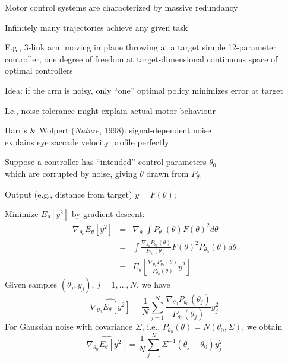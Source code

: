 \documentclass{article}
\begin{document}
\begin{huge}

Motor control systems are characterized by massive redundancy

Infinitely many trajectories achieve any given task

E.g., 3-link arm moving in plane throwing at a target\nl
  simple 12-parameter controller, one degree of freedom at target-dimensional continuous space of optimal controllers

Idea: if the arm is noisy, only ``one'' optimal policy
minimizes error at target

I.e., noise-tolerance might explain actual motor behaviour

Harris \& Wolpert ({\em Nature}, 1998):  signal-dependent noise\\
explains eye saccade velocity profile perfectly


Suppose a controller has ``intended'' control parameters $\theta_0$\\
which are corrupted by noise, giving $\theta$ drawn from $P_{\theta_0}$

Output (e.g., distance from target) $y = F(\theta)$; 


\maxfigwidth
{}



Minimize $E_{\theta}[y^2]$ by gradient descent:
\begin{eqnarray*}
\nabla_{\theta_0} E_{\theta}[y^2]
  &=&  \nabla_{\theta_0} \int P_{\theta_0}(\theta)F(\theta)^2 d\theta \\
  &=&  \int \frac{\nabla_{\theta_0} P_{\theta_0}(\theta)}{P_{\theta_0}(\theta)}
            F(\theta)^2 P_{\theta_0}(\theta)d\theta \\
  &=&  E_{\theta}[\frac{\nabla_{\theta_0} P_{\theta_0}(\theta)}
                       {P_{\theta_0}(\theta)}
                  y^2]
\end{eqnarray*}
Given samples $(\theta_j,y_j)$, $j=1,\ldots,N$, we have
\[
  \hat{\nabla_{\theta_0} E_{\theta}[y^2]} =
  \frac{1}{N}\sum_{j=1}^N
     \frac{\nabla_{\theta_0} P_{\theta_0}(\theta_j)}
                       {P_{\theta_0}(\theta_j)}
                  y_j^2
\]
For Gaussian noise with covariance $\Sigma$, i.e.,
$P_{\theta_0}(\theta) = N(\theta_0,\Sigma)$, we obtain
\[
  \hat{\nabla_{\theta_0} E_{\theta}[y^2]} =
  \frac{1}{N}\sum_{j=1}^N \Sigma^{-1}(\theta_j - \theta_0) y_j^2
\]



\end{huge}
\end{document}
